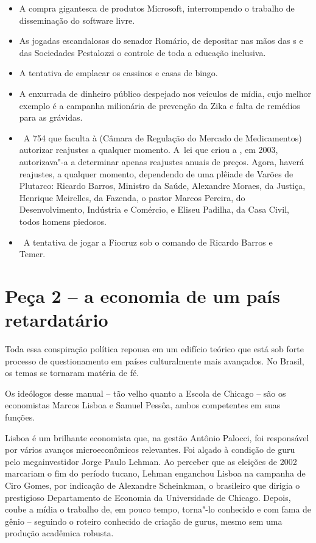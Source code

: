 \begin{itemize}
  investimento, reeditando estratagema utilizado pelo inacreditável
  Paulo Bernardo, quando Ministro das Comunicações. Na prática, equivale
  a perdoar as dívidas, já que os investimentos teriam que ser feitos de
  qualquer maneira, por obrigação contratual ou exigência de mercado.
\item
   A compra gigantesca de produtos Microsoft, interrompendo o
  trabalho de disseminação do software livre.
\item
   As jogadas escandalosas do senador Romário, de depositar nas
  mãos das s e das Sociedades Pestalozzi o controle de toda a
  educação inclusiva.
\item
   A tentativa de emplacar os cassinos e casas de bingo.
\item
   A enxurrada de dinheiro público despejado nos veículos de mídia,
  cujo melhor exemplo é a campanha milionária de prevenção da Zika e
  falta de remédios para as grávidas.
\item
   ~A  754 que faculta à  (Câmara de Regulação do Mercado de
  Medicamentos) autorizar reajustes a qualquer momento. A~lei que criou
  a , em 2003, autorizava"-a a determinar apenas reajustes anuais de
  preços. Agora, haverá reajustes, a qualquer momento, dependendo de uma
  plêiade de Varões de Plutarco: Ricardo Barros, Ministro da Saúde,
  Alexandre Moraes, da Justiça, Henrique Meirelles, da Fazenda, o pastor
  Marcos Pereira, do Desenvolvimento, Indústria e Comércio, e Eliseu
  Padilha, da Casa Civil, todos homens piedosos.
\item
   ~A tentativa de jogar a Fiocruz sob o comando de Ricardo Barros
  e Temer.~~~~~~~~~
\end{itemize}

\section{Peça 2 -- a economia de um país retardatário}

Toda essa conspiração política repousa em um edifício teórico que está
sob forte processo de questionamento em países culturalmente mais
avançados. No Brasil, os temas se tornaram matéria de fé.

Os ideólogos desse manual -- tão velho quanto a Escola de Chicago -- são
os economistas Marcos Lisboa e Samuel Pessôa, ambos competentes em suas
funções.

Lisboa é um brilhante economista que, na gestão Antônio Palocci, foi
responsável por vários avanços microeconômicos relevantes. Foi alçado à
condição de guru pelo megainvestidor Jorge Paulo Lehman. Ao perceber que
as eleições de 2002 marcariam o fim do período tucano, Lehman enganchou
Lisboa na campanha de Ciro Gomes, por indicação de Alexandre Scheinkman,
o brasileiro que dirigia o prestigioso Departamento de Economia da
Universidade de Chicago. Depois, coube a mídia o trabalho de, em pouco
tempo, torna"-lo conhecido e com fama de gênio -- seguindo o roteiro
conhecido de criação de gurus, mesmo sem uma produção acadêmica robusta.

